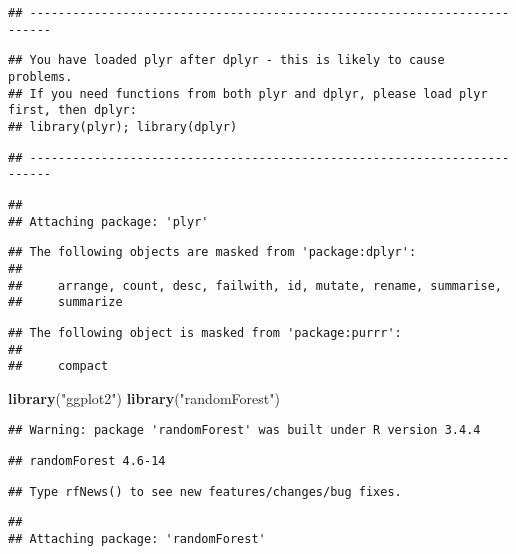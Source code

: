 \documentclass[]{article}
\newenvironment{Shaded}{\begin{snugshade}}{\end{snugshade}}
\newcommand{\KeywordTok}[1]{\textcolor[rgb]{0.13,0.29,0.53}{\textbf{#1}}}
\newcommand{\StringTok}[1]{\textcolor[rgb]{0.31,0.60,0.02}{#1}}
\newcommand{\NormalTok}[1]{#1}
\begin{document}
\begin{verbatim}
## -------------------------------------------------------------------------
\end{verbatim}

\begin{verbatim}
## You have loaded plyr after dplyr - this is likely to cause problems.
## If you need functions from both plyr and dplyr, please load plyr first, then dplyr:
## library(plyr); library(dplyr)
\end{verbatim}

\begin{verbatim}
## -------------------------------------------------------------------------
\end{verbatim}

\begin{verbatim}
## 
## Attaching package: 'plyr'
\end{verbatim}

\begin{verbatim}
## The following objects are masked from 'package:dplyr':
## 
##     arrange, count, desc, failwith, id, mutate, rename, summarise,
##     summarize
\end{verbatim}

\begin{verbatim}
## The following object is masked from 'package:purrr':
## 
##     compact
\end{verbatim}

\begin{Shaded}
\begin{Highlighting}[]
\KeywordTok{library}\NormalTok{(}\StringTok{"ggplot2"}\NormalTok{)}
\KeywordTok{library}\NormalTok{(}\StringTok{"randomForest"}\NormalTok{)}
\end{Highlighting}
\end{Shaded}

\begin{verbatim}
## Warning: package 'randomForest' was built under R version 3.4.4
\end{verbatim}

\begin{verbatim}
## randomForest 4.6-14
\end{verbatim}

\begin{verbatim}
## Type rfNews() to see new features/changes/bug fixes.
\end{verbatim}

\begin{verbatim}
## 
## Attaching package: 'randomForest'
\end{verbatim}
\end{document}
